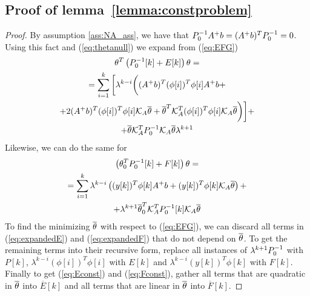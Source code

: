 
\subsection{Proof of lemma~\ref{lemma:constproblem}}
\label{app:constproof}
\begin{proof}
    By assumption \ref{ass:NA_ass}, we have that $P_0^{-1} A^+b = (A^+b)^TP_0^{-1} = 0$.
    Using this fact and (\ref{eq:thetanull}) we expand from (\ref{eq:EFG})
    \begin{equation}
        \begin{gathered}
            \theta^T\left(P_0^{-1}[k] + E[k]\right)\theta = \\
            = \sum\limits_{i=1}^k \bigg{[} \lambda^{k-i}\bigg{(}(A^+b)^T(\phi[i])^T\phi[i]A^+b
            + \\
            + 2(A^+b)^T(\phi[i])^T\phi[i]\mathcal{K}_A\overline{\theta} + \overline{\theta}^T\mathcal{K}_A^T(\phi[i])^T\phi[i]\mathcal{K}_A\overline{\theta} \bigg{)} \bigg{]} + \\
            + \overline{\theta}\mathcal{K}_A^TP_0^{-1}\mathcal{K}_A\overline{\theta}\lambda^{k+1}
        \end{gathered}
        \label{eq:expandedE}
    \end{equation}
    Likewise, we can do the same for 
    \begin{equation}
        \begin{gathered}
            \left(\theta_0^TP_0^{-1}[k] + F[k]\right)\theta = \\
            = \sum\limits_{i=1}^k \lambda^{k-i}\left((y[k])^T\phi[k]A^+b + (y[k])^T\phi[k]\mathcal{K}_A\overline{\theta}\right) + \\
            + \lambda^{k+1}\overline{\theta}_0^T\mathcal{K}_A^TP_0^{-1}[k]\mathcal{K}_A\overline{\theta}
        \end{gathered}
        \label{eq:expandedF}
    \end{equation}
    To find the minimizing $\overline{\theta}$ with respect to (\ref{eq:EFG}), we can discard
    all terms in (\ref{eq:expandedE}) and (\ref{eq:expandedF}) that do not depend on $\overline{\theta}$.
    To get the remaining terms into their recursive form, replace all instances of
    $\lambda^{k+1}P_0^{-1}$ with $P[k]$, $\lambda^{k-i}(\phi[i])^T\phi[i]$ with $E[k]$ and
    $\lambda^{k-i}(y[k])^T\phi[k]$ with $F[k]$. Finally to get (\ref{eq:Econst}) and (\ref{eq:Fconst}),
    gather all terms that are quadratic in $\overline{\theta}$ into $\overline{E}[k]$ and all terms that are linear in
    $\overline{\theta}$ into $\overline{F}[k]$.
\end{proof}

